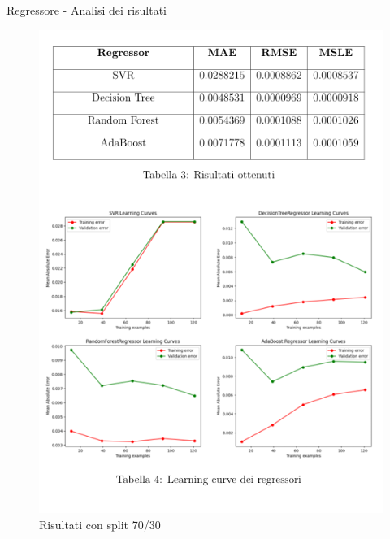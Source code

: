 \begin{frame}{Regressore - Analisi dei risultati}
    \begin{figure}
    \centering
    \includegraphics[height=0.8\textheight]{images/RegressorePrecedente.png}
    \caption{Risultati con split 70/30}
\end{figure}
\end{frame}
